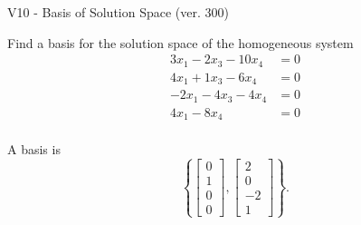 \begin{exercise}
  \begin{exerciseTitle}V10 - Basis of Solution Space (ver. 300)\end{exerciseTitle}
  \begin{exerciseStatement}
    Find a basis for the solution space of the homogeneous system 
\begin{align*}
 3 x_ 1 -2 x_ 3 -10 x_ 4 &= 0  \\ 
  4 x_ 1 + 1 x_ 3 -6 x_ 4 &= 0  \\ 
  -2 x_ 1 -4 x_ 3 -4 x_ 4 &= 0  \\ 
  4 x_ 1 -8 x_ 4 &= 0  \\ 
 \end{align*}


 
  \end{exerciseStatement}

  \begin{exerciseAnswer}
   A basis is   
\[\left\{\left[\begin{array}{c}
0 \\
1 \\
0 \\
0
\end{array}\right] , \left[\begin{array}{c}
2 \\
0 \\
-2 \\
1
\end{array}\right]\right\}.\]

  


  \end{exerciseAnswer}
\end{exercise}